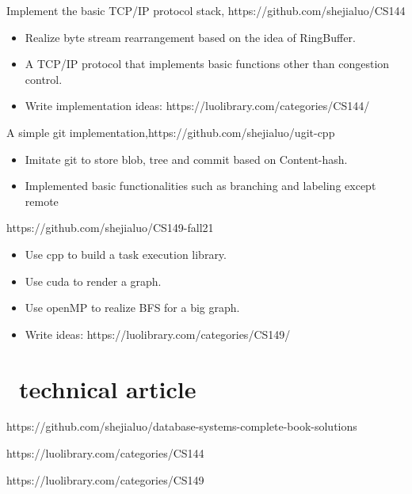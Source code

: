 \documentclass{resume}
\begin{document}
Implement the basic TCP/IP protocol stack, https://github.com/shejialuo/CS144
\begin{itemize}
  \item Realize byte stream rearrangement based on the idea of RingBuffer.
  \item A TCP/IP protocol that implements basic functions other than congestion control.
  \item Write implementation ideas: https://luolibrary.com/categories/CS144/
\end{itemize}

A simple git implementation,https://github.com/shejialuo/ugit-cpp
\begin{itemize}
  \item Imitate git to store blob, tree and commit based on Content-hash.
  \item Implemented basic functionalities such as branching and labeling except remote
\end{itemize}

https://github.com/shejialuo/CS149-fall21
\begin{itemize}
  \item Use cpp to build a task execution library.
  \item Use cuda to render a graph.
  \item Use openMP to realize BFS for a big graph.
  \item Write ideas: https://luolibrary.com/categories/CS149/
\end{itemize}

\section{\faBook\ technical article}

https://github.com/shejialuo/database-systems-complete-book-solutions

https://luolibrary.com/categories/CS144

https://luolibrary.com/categories/CS149
\end{document}
